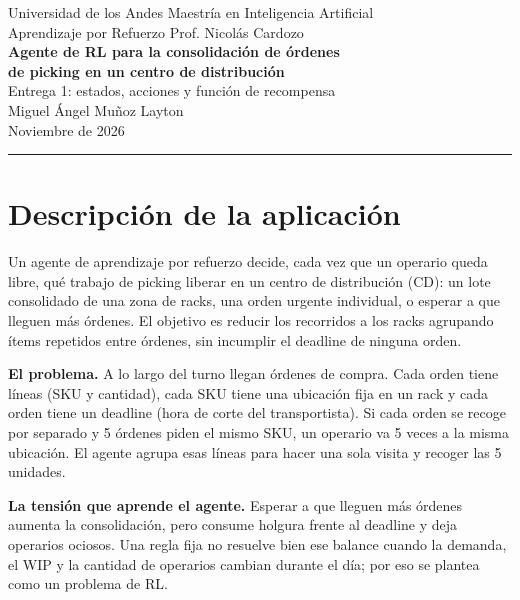 \documentclass[11pt,letterpaper]{article}
\begin{document}
\begin{center}
  {\small Universidad de los Andes \textperiodcentered{} Maestría en Inteligencia Artificial}\\[2pt]
  {\small Aprendizaje por Refuerzo \textperiodcentered{} Prof. Nicolás Cardozo}\\[10pt]
  {\LARGE\bfseries\color{azul} Agente de RL para la consolidación de órdenes\\[2pt] de picking en un centro de distribución}\\[8pt]
  {\large Entrega 1: estados, acciones y función de recompensa}\\[8pt]
  Miguel Ángel Muñoz Layton \quad\textperiodcentered{}\\[2pt]
  {\small Noviembre de 2026}
\end{center}

\vspace{4pt}
\hrule
\vspace{8pt}

\section{Descripción de la aplicación}

Un agente de aprendizaje por refuerzo decide, cada vez que un operario queda libre,
qué trabajo de picking liberar en un centro de distribución (CD): un lote consolidado de
una zona de racks, una orden urgente individual, o esperar a que lleguen más órdenes.
El objetivo es reducir los recorridos a los racks agrupando ítems repetidos entre órdenes,
sin incumplir el deadline de ninguna orden.

\textbf{El problema.} A lo largo del turno llegan órdenes de compra. Cada orden tiene líneas
(SKU y cantidad), cada SKU tiene una ubicación fija en un rack y cada orden tiene un deadline
(hora de corte del transportista). Si cada orden se recoge por separado y 5 órdenes piden el
mismo SKU, un operario va 5 veces a la misma ubicación. El agente agrupa esas líneas para hacer
una sola visita y recoger las 5 unidades.

\textbf{La tensión que aprende el agente.} Esperar a que lleguen más órdenes aumenta la
consolidación, pero consume holgura frente al deadline y deja operarios ociosos. Una regla fija
no resuelve bien ese balance cuando la demanda, el WIP y la cantidad de operarios cambian durante
el día; por eso se plantea como un problema de RL.
\end{document}
